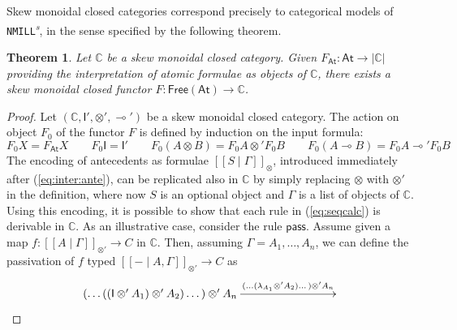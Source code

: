 \documentclass[copyright,creativecommons]{eptcs}
\newtheorem{theorem}{Theorem}[section]
\theoremstyle{definition}
\newcommand{\ldbc}{[\![}
\newcommand{\rdbc}{]\!]}
\newcommand{\pass}{\mathsf{pass}}
\newcommand{\ot}{\otimes}
\newcommand{\lolli}{\multimap}
\newcommand{\I}{\mathsf{I}}
\newcommand{\NMILL}{\texttt{NMILL}}
\newcommand{\SkNMILL}{\NMILL\textsuperscript{\textit{s}}}
\newcommand{\FSkMCC}{\mathsf{Free}}
\begin{document}
Skew monoidal closed categories correspond precisely to categorical models of \SkNMILL, in the sense specified by the following theorem.
\begin{theorem}\label{thm:models}
  Let $\mathbb{C}$ be a skew monoidal closed category. Given $F_{\mathsf{At}} : \mathsf{At} \rightarrow |\mathbb{C}|$ providing the interpretation of atomic formulae as objects of $\mathbb{C}$, there exists a skew monoidal closed functor $F : \FSkMCC(\mathsf{At}) \rightarrow \mathbb{C}$.
\end{theorem}
\begin{proof}
  Let $(\mathbb{C} , \I' , \ot' , \lolli')$ be a skew monoidal closed category.
  The action on object $F_0$ of the functor $F$ is defined by induction on the input formula:
  \begin{equation*}
    F_0X = F_{\mathsf{At}}X
    \qquad
    F_0\I = \I'
    \qquad
    F_0(A \ot B) = F_0A \ot' F_0B
    \qquad
    F_0(A \lolli B) = F_0A \lolli' F_0B
  \end{equation*}
  The encoding of antecedents as formulae $\ldbc S \mid \Gamma \rdbc_{\ot}$, introduced immediately after (\ref{eq:inter:ante}), can be replicated also in $\mathbb{C}$ by simply replacing $\ot$ with $\ot'$ in the definition, where now $S$ is an optional object and $\Gamma$ is a list of objects of $\mathbb{C}$. Using this encoding, it is possible to show that each rule in (\ref{eq:seqcalc}) is derivable in $\mathbb{C}$. As an illustrative case, consider the rule $\pass$. Assume given a map $f : \ldbc A \mid \Gamma \rdbc_{\ot'} \to C$ in $\mathbb{C}$. Then, assuming $\Gamma = A_1,\dots,A_n$, we can define the passivation of $f$ typed $\ldbc {-} \mid A, \Gamma \rdbc_{\ot'} \to C$ as 
\[\xymatrixcolsep{7pc}
\xymatrix{
  (\dots ((\I \ot' A_1) \ot' A_2) \dots ) \ot' A_n
  \ar[r]^-{(\dots (\lambda_{A_1} \ot' A_2) \dots ) \ot' A_n} &
}\]
\end{proof}
\end{document}
